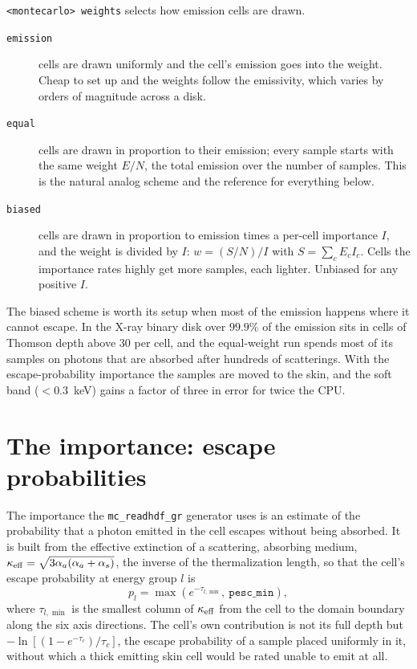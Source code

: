 \documentclass[11pt]{article}
\newcommand{\key}[1]{\texttt{#1}}
\begin{document}
\key{<montecarlo> weights} selects how emission cells are drawn.
\begin{description}
\item[\key{emission}] cells are drawn uniformly and the cell's emission goes into the
  weight. Cheap to set up and the weights follow the emissivity, which varies by orders
  of magnitude across a disk.
\item[\key{equal}] cells are drawn in proportion to their emission; every sample starts
  with the same weight $E/N$, the total emission over the number of samples. This is the
  natural analog scheme and the reference for everything below.
\item[\key{biased}] cells are drawn in proportion to emission times a per-cell importance
  $I$, and the weight is divided by $I$: $w = (S/N)/I$ with $S = \sum_c E_c I_c$. Cells
  the importance rates highly get more samples, each lighter. Unbiased for any positive
  $I$.
\end{description}
The biased scheme is worth its setup when most of the emission happens where it cannot
escape. In the X-ray binary disk over $99.9\%$ of the emission sits in cells of Thomson
depth above 30 per cell, and the equal-weight run spends most of its samples on photons
that are absorbed after hundreds of scatterings. With the escape-probability importance
the samples are moved to the skin, and the soft band ($<0.3$~keV) gains a factor of three
in error for twice the CPU.

\section{The importance: escape probabilities}

The importance the \key{mc\_readhdf\_gr} generator uses is an estimate of the probability
that a photon emitted in the cell escapes without being absorbed. It is built from the
effective extinction of a scattering, absorbing medium,
$\kappa_{\rm eff} = \sqrt{3\alpha_a(\alpha_a+\alpha_s)}$, the inverse of the
thermalization length, so that the cell's escape probability at energy group $l$ is
\begin{equation}
  p_l = \max\!\left(e^{-\tau_{l,\min}},\ \key{pesc\_min}\right),
\end{equation}
where $\tau_{l,\min}$ is the smallest column of $\kappa_{\rm eff}$ from the cell to the
domain boundary along the six axis directions. The cell's own contribution is not its
full depth but $-\ln[(1-e^{-\tau_c})/\tau_c]$, the escape probability of a sample placed
uniformly in it, without which a thick emitting skin cell would be rated unable to emit
at all.
\end{document}
